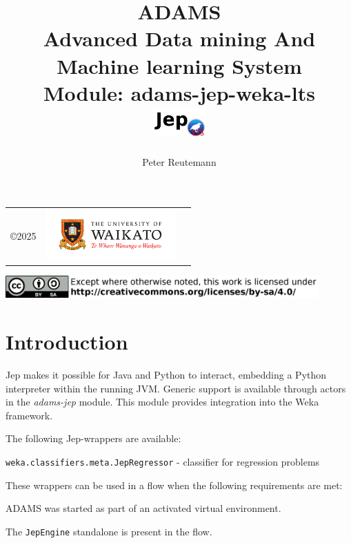 \documentclass[a4paper]{book}
\title{
  \textbf{ADAMS} \\
  {\Large \textbf{A}dvanced \textbf{D}ata mining \textbf{A}nd \textbf{M}achine
  learning \textbf{S}ystem} \\
  {\Large Module: adams-jep-weka-lts} \\
  \vspace{1cm}
  \includegraphics[width=2cm]{images/jep-weka-lts-module.png} \\
}
\author{
  Peter Reutemann
}
\begin{document}
\begin{titlepage}
\maketitle

\thispagestyle{empty}
\center
\begin{table}[b]
	\begin{tabular}{c l l}
		\parbox[c][2cm]{2cm}{\copyright 2025} &
		\parbox[c][2cm]{5cm}{\includegraphics[width=5cm]{images/coat_of_arms.pdf}} \\
	\end{tabular}
	\includegraphics[width=12cm]{images/cc.png} \\
\end{table}

\end{titlepage}

\tableofcontents


\chapter{Introduction}
Jep\cite{jep} makes it possible for Java and Python to interact, embedding a Python
interpreter within the running JVM. Generic support is available through actors
in the \textit{adams-jep} module. This module provides integration into the Weka
framework.

\noindent The following Jep-wrappers are available:
\begin{tight_itemize}
    \item \texttt{weka.classifiers.meta.JepRegressor} - classifier for regression problems
\end{tight_itemize}

\noindent These wrappers can be used in a flow when the following requirements are met:
\begin{tight_itemize}
    \item ADAMS was started as part of an activated virtual environment.
    \item The \texttt{JepEngine} standalone is present in the flow.
\end{tight_itemize}



\end{document}
